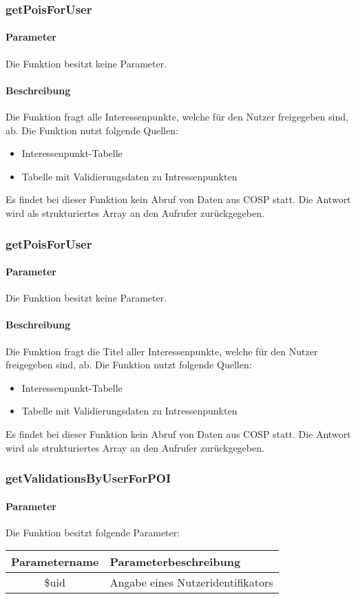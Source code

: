 \subsubsection{getPoisForUser}
\paragraph{Parameter} Die Funktion besitzt keine Parameter.
\paragraph{Beschreibung} Die Funktion fragt alle Interessenpunkte, welche für den Nutzer freigegeben sind, ab. Die Funktion nutzt folgende Quellen:
\begin{itemize}
	\item Interessenpunkt-Tabelle
	\item Tabelle mit Validierungsdaten zu Intressenpunkten
\end{itemize}
Es findet bei dieser Funktion kein Abruf von Daten aus {\glqq COSP\grqq} statt. Die Antwort wird als strukturiertes Array an den Aufrufer zurückgegeben.
\subsubsection{getPoisForUser}
\paragraph{Parameter} Die Funktion besitzt keine Parameter.
\paragraph{Beschreibung} Die Funktion fragt die Titel aller Interessenpunkte, welche für den Nutzer freigegeben sind, ab. Die Funktion nutzt folgende Quellen:
\begin{itemize}
	\item Interessenpunkt-Tabelle
	\item Tabelle mit Validierungsdaten zu Intressenpunkten
\end{itemize}
Es findet bei dieser Funktion kein Abruf von Daten aus {\glqq COSP\grqq} statt. Die Antwort wird als strukturiertes Array an den Aufrufer zurückgegeben.
\subsubsection{getValidationsByUserForPOI}
\paragraph{Parameter} Die Funktion besitzt folgende Parameter:
\begin{table}[H]
	\begin{tabular}{|c|p{11cm}|}
		\hline
		\textbf{Parametername} & \textbf{Parameterbeschreibung} \\ \hline
		\$uid & Angabe eines Nutzeridentifikators \\ \hline
	\end{tabular}
\end{table}
